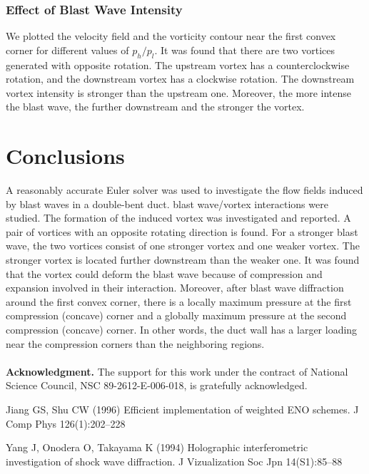 \documentclass[runningheads]{svmult}
\begin{document}
\subsubsection*{Effect of Blast Wave Intensity}

   We plotted the velocity field and the vorticity contour near the first convex corner for different values of \(p_h/p_l\). It was found that there are two vortices generated with opposite rotation. The upstream vortex has a counterclockwise rotation, and the downstream vortex has a clockwise rotation. The downstream vortex intensity is stronger than the upstream one. Moreover, the more intense the blast wave, the further downstream and the stronger the vortex. 

\section{Conclusions}

A reasonably accurate Euler solver was used to investigate the flow fields induced by blast waves in a double-bent duct. blast wave/vortex interactions were studied. The formation of the induced vortex was investigated and reported. A pair of vortices with an opposite rotating direction is found. For a stronger blast wave, the two vortices consist of one stronger vortex and one weaker vortex. The stronger vortex is located further downstream than the weaker one. It was found that the vortex could deform the blast wave because of compression and expansion involved in their interaction. Moreover, after blast wave diffraction around the first convex corner, there is a locally maximum pressure at the first compression (concave) corner and a globally maximum pressure at the second compression (concave) corner. In other words, the duct wall has a larger loading near the compression corners than the neighboring regions.
\\\\
{\small{\bf Acknowledgment.}
The support for this work under the contract of National Science Council, NSC 89-2612-E-006-018, is gratefully acknowledged.
}

\begin{thebibliography}{2}


 Jiang GS, Shu CW (1996) Efficient implementation of weighted ENO schemes. J Comp Phys 126(1):202--228

 Yang J, Onodera O, Takayama K (1994) Holographic interferometric investigation of shock wave diffraction. J Vizualization Soc Jpn 14(S1):85--88

\end{thebibliography}
\end{document}
